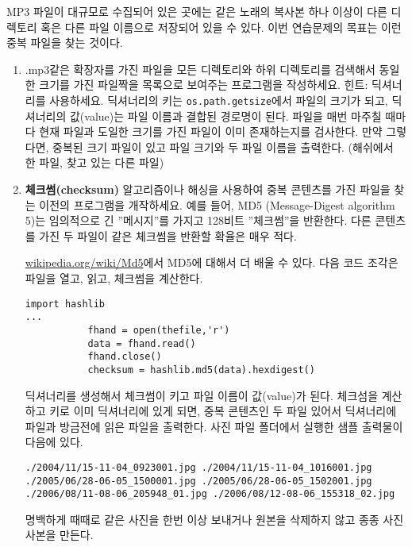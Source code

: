 \begin{ex}
\label{checksum}


MP3 파일이 대규모로 수집되어 있은 곳에는 같은 노래의 복사본 하나 이상이 다른 디렉토리 혹은 다른 파일 이름으로 저장되어 있을 수 있다.
이번 연습문제의 목표는 이런 중복 파일을 찾는 것이다.

\begin{enumerate}

\item .mp3같은 확장자를 가진 파일을 모든 디렉토리와 하위 디렉토리를 검색해서 동일한 크기를 가진 파일짝을 목록으로 보여주는 프로그램을 작성하세요.
힌트: 딕셔너리를 사용하세요. 딕셔너리의 키는 {\tt  os.path.getsize}에서 파일의 크기가 되고, 딕셔너리의 값(value)는
파일 이름과 결합된 경로명이 된다. 파일을 매번 마주칠 때마다 현재 파일과 도일한 크기를 가진 파일이 이미 존재하는지를 검사한다.
만약 그렇다면, 중복된 크기 파일이 있고 파일 크기와 두 파일 이름을 출력한다. (해쉬에서 한 파일, 찾고 있는 다른 파일)



\item {\bf 체크썸(checksum)} 알고리즘이나 해싱을 사용하여 중복 콘텐츠를 가진 파일을 찾는 이전의 프로그램을 개작하세요.
예를 들어, MD5 (Message-Digest algorithm 5)는 임의적으로 긴 ''메시지''를 가지고 128비트 ''체크썸''을 반환한다.
다른 콘텐츠를 가진 두 파일이 같은 체크썸을 반환할 확율은 매우 적다.

\url{wikipedia.org/wiki/Md5}에서 MD5에 대해서 더 배울 수 있다. 다음 코드 조각은 파일을 열고, 읽고, 체크썸을 계산한다.

\beforeverb
\begin{verbatim}
import hashlib 
...
           fhand = open(thefile,'r')
           data = fhand.read()
           fhand.close()
           checksum = hashlib.md5(data).hexdigest()
\end{verbatim}
\afterverb
%

딕셔너리를 생성해서 체크썸이 키고 파일 이름이 값(value)가 된다.
체크섬을 계산하고 키로 이미 딕셔너리에 있게 되면, 중복 콘텐츠인 두 파일 있어서
딕셔너리에 파일과 방금전에 읽은 파일을 출력한다. 사진 파일 폴더에서 실행한 샘플 출력물이 다음에 있다.

\beforeverb
\begin{verbatim}
./2004/11/15-11-04_0923001.jpg ./2004/11/15-11-04_1016001.jpg
./2005/06/28-06-05_1500001.jpg ./2005/06/28-06-05_1502001.jpg
./2006/08/11-08-06_205948_01.jpg ./2006/08/12-08-06_155318_02.jpg
\end{verbatim}
\afterverb
%

명백하게 때때로 같은 사진을 한번 이상 보내거나 원본을 삭제하지 않고 종종 사진 사본을 만든다.

\end{enumerate}

\end{ex}

